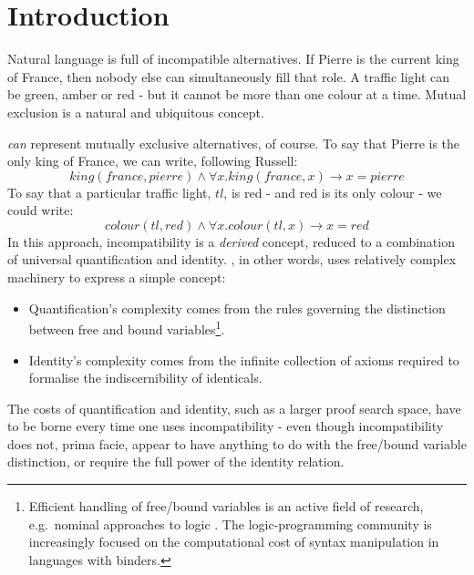 \section{Introduction}\label{introduction}

Natural language is full of incompatible alternatives.
If Pierre is the current king of France, then nobody else can simultaneously fill that role.
A traffic light can be green, amber or red - but it cannot be more than one colour at a time.
Mutual exclusion is a natural and ubiquitous concept.

\FOL{} \emph{can} represent mutually exclusive alternatives, of course.
To say that Pierre is the only king of France, we can write, following Russell:
\[
king(france, pierre) \land \forall x . king(france, x) \rightarrow x = pierre
\]
To say that a particular traffic light, $tl$, is red - and red is its only colour - we could write:
\[
colour(tl, red) \land \forall x . colour(tl, x) \rightarrow x = red
\]
In this approach, incompatibility is a \emph{derived} concept, reduced to 
a combination of universal quantification and identity.  
\FOL{}, in other words, uses relatively complex machinery to express a
simple concept:
\begin{itemize}

\item Quantification's complexity comes from the
  rules governing the distinction between free
  and bound variables\footnote{Efficient handling of free/bound variables
    is an active field of research, e.g.~nominal approaches to logic
    \cite{PittsAM:nomsetnasics}. The logic-programming community is increasingly focused on the computational cost of
    syntax manipulation in languages with binders.}.

\item Identity's complexity comes from the infinite collection of axioms required to formalise the
  indiscernibility of identicals.

\end{itemize}

\NI The costs of quantification and identity, such as a larger proof
search space, have to be borne every time one uses incompatibility - even
though incompatibility does not, prima facie, appear to have anything to do
with the free/bound variable distinction, or require the full power of 
the identity relation.

